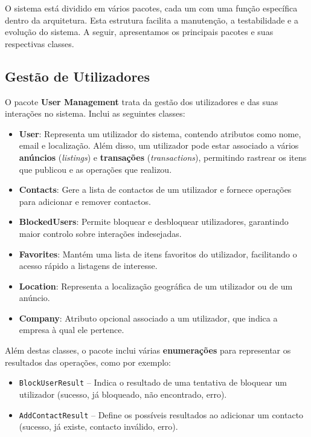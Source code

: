 \documentclass[a4paper, 12pt]{article} %
\begin{document}
O sistema está dividido em vários pacotes, cada um com uma função específica dentro da arquitetura. Esta estrutura facilita a manutenção, a testabilidade e a evolução do sistema. A seguir, apresentamos os principais pacotes e suas respectivas classes.

\subsection{Gestão de Utilizadores}

O pacote \textbf{User Management} trata da gestão dos utilizadores e das suas interações no sistema. Inclui as seguintes classes:

\begin{itemize}
	\item \textbf{User}: Representa um utilizador do sistema, contendo atributos como nome, email e localização. Além disso, um utilizador pode estar associado a vários \textbf{anúncios} (\textit{listings}) e \textbf{transações} (\textit{transactions}), permitindo rastrear os itens que publicou e as operações que realizou.
	\item \textbf{Contacts}: Gere a lista de contactos de um utilizador e fornece operações para adicionar e remover contactos.
	\item \textbf{BlockedUsers}: Permite bloquear e desbloquear utilizadores, garantindo maior controlo sobre interações indesejadas.
	\item \textbf{Favorites}: Mantém uma lista de itens favoritos do utilizador, facilitando o acesso rápido a listagens de interesse.
	\item \textbf{Location}: Representa a localização geográfica de um utilizador ou de um anúncio.
	\item \textbf{Company}: Atributo opcional associado a um utilizador, que indica a empresa à qual ele pertence.
\end{itemize}

Além destas classes, o pacote inclui várias \textbf{enumerações} para representar os resultados das operações, como por exemplo:

\begin{itemize}
	\item \texttt{BlockUserResult} – Indica o resultado de uma tentativa de bloquear um utilizador (sucesso, já bloqueado, não encontrado, erro).
	\item \texttt{AddContactResult} – Define os possíveis resultados ao adicionar um contacto (sucesso, já existe, contacto inválido, erro).
\end{itemize}
\end{document}
